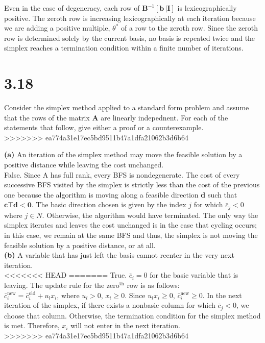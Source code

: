 \documentclass{article}
\begin{document}
\noindent
Even in the case of degeneracy, each row of $\mathbf{B}^{-1} [\mathbf{b} \, | \mathbf{I}]$ is lexicographically positive.  The zeroth row is increasing lexicographically at each iteration because we are adding a positive multiple, $\theta^*$ of a row to the zeroth row.  Since the zeroth row is determined solely by the current basis, no basis is repeated twice and the simplex reaches a termination condition within a finite number of iterations.


\section*{3.18} 
Consider the simplex method applied to a standard form problem and assume that the rows of the matrix \textbf{A} are linearly indepednent.  For each of the statements that follow, give either a proof or a counterexample.\\
>>>>>>> ea774a31e17ec5bd9511b47a1dfa21062b3d6b64

\noindent
\textbf{(a)} An iteration of the simplex method may move the feasible solution by a positive distance while leaving the cost unchanged. \\

\noindent
False.  Since A has full rank, every BFS is nondegenerate.  The cost of every successive BFS visited by the simplex is strictly less than the cost of the previous one because the algorithm is moving along a feasible direction \textbf{d} such that $\mathbf{c\top d < 0}$.  The basic direction chosen is given by the index $j$ for which $\bar{c}_j < 0$ where $j \in N$. Otherwise, the algorithm would have terminated.  The only way the simplex iterates and leaves the cost unchanged is in the case that cycling occurs; in this case, we remain at the same BFS and thus, the simplex is not moving the feasible solution by a positive distance, or at all. \\

\noindent
\textbf{(b)} A variable that has just left the basis cannot reenter in the very next iteration. \\

<<<<<<< HEAD
=======
\noindent
True. $\bar{c}_i = 0$ for the basic variable that is leaving.  The update rule for the zero$^\text{th}$ row is as follows: \\
$\bar{c}_i^{\text{new}} = \bar{c}_i^{\text{old}} + u_l x_i$, where $u_l > 0$, $x_i \geq 0$.
Since $u_l x_i \geq 0$, $\bar{c}_i^{\text{new}} \geq 0$.  In the next iteration of the simplex, if there exists a nonbasic column for which $\bar{c}_j < 0$, we choose that column.  Otherwise, the termination condition for the simplex method is met.  Therefore, $x_i$ will not enter in the next iteration.\\
>>>>>>> ea774a31e17ec5bd9511b47a1dfa21062b3d6b64
\end{document}
